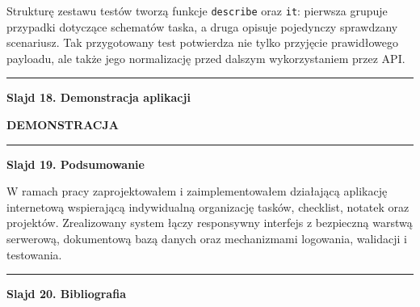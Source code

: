 \documentclass[12pt,a4paper]{article}
\newif\iffirstslide
\newcommand{\Slide}[2]{%
  \iffirstslide
    \global\firstslidefalse
  \else
    \par\vspace{1.5\baselineskip}%
    \noindent\rule{\textwidth}{0.8pt}%
    \par\vspace{1.5\baselineskip}%
  \fi
  {\LARGE\bfseries Slajd #1. #2\par}%
  \vspace{2\baselineskip}%
}
\begin{document}
Strukturę zestawu testów tworzą funkcje \texttt{describe} oraz \texttt{it}: pierwsza grupuje przypadki dotyczące schematów taska, a druga opisuje pojedynczy sprawdzany scenariusz. Tak przygotowany test potwierdza nie tylko przyjęcie prawidłowego payloadu, ale także jego normalizację przed dalszym wykorzystaniem przez API.

\Slide{18}{Demonstracja aplikacji}

\begin{center}
  {\Huge\bfseries DEMONSTRACJA}
\end{center}

\Slide{19}{Podsumowanie}

W ramach pracy zaprojektowałem i zaimplementowałem działającą aplikację internetową wspierającą indywidualną organizację tasków, checklist, notatek oraz projektów. Zrealizowany system łączy responsywny interfejs z bezpieczną warstwą serwerową, dokumentową bazą danych oraz mechanizmami logowania, walidacji i testowania.

\Slide{20}{Bibliografia}
\end{document}
